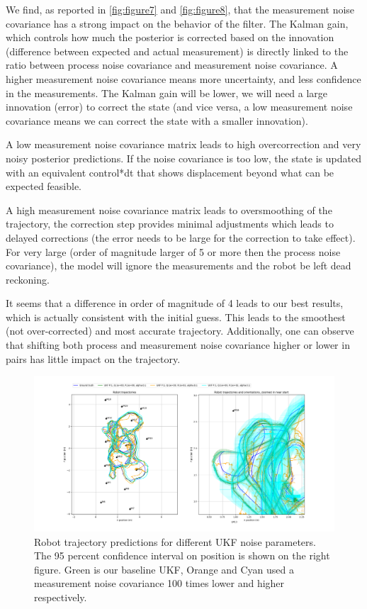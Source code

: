\documentclass{article}
\begin{document}
We find, as reported in \autoref{fig:figure7} and \autoref{fig:figure8}, that the measurement noise covariance has a strong impact on the behavior of the filter. The Kalman gain, which controls how much the posterior is corrected based on the innovation (difference between expected and actual measurement) is directly linked to the ratio between process noise covariance and measurement noise covariance. A higher measurement noise covariance means more uncertainty, and less confidence in the measurements. The Kalman gain will be lower, we will need a large innovation (error) to correct the state (and vice versa, a low measurement noise covariance means we can correct the state with a smaller innovation).

A low measurement noise covariance matrix leads to high overcorrection and very noisy posterior predictions. If the noise covariance is too low, the state is updated with an equivalent control*dt that shows displacement beyond what can be expected feasible.

A high measurement noise covariance matrix leads to oversmoothing of the trajectory, the correction step provides minimal adjustments which leads to delayed corrections (the error needs to be large for the correction to take effect). For very large (order of magnitude larger of 5 or more then the process noise covariance), the model will ignore the measurements and the robot be left dead reckoning.

It seems that a difference in order of magnitude of 4 leads to our best results, which is actually consistent with the initial guess. This leads to the smoothest (not over-corrected) and most accurate trajectory. Additionally, one can observe that shifting both process and measurement noise covariance higher or lower in pairs has little impact on the trajectory.

\begin{figure}
\centering
\includegraphics[width=\textwidth]{Figure_6.png}
\caption{Robot trajectory predictions for different UKF noise parameters. The 95 percent confidence interval on position is shown on the right figure. Green is our baseline UKF, Orange and Cyan used a measurement noise covariance 100 times lower and higher respectively.}
\label{fig:figure6}
\end{figure}
\end{document}
